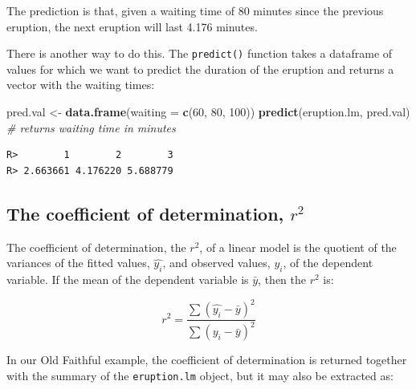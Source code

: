 \documentclass[english,10pt,a4paper,oneside]{book}
\newenvironment{Shaded}{\begin{snugshade}}{\end{snugshade}}
\newcommand{\CommentTok}[1]{\textcolor[rgb]{0.56,0.35,0.01}{\textit{#1}}}
\newcommand{\DataTypeTok}[1]{\textcolor[rgb]{0.13,0.29,0.53}{#1}}
\newcommand{\DecValTok}[1]{\textcolor[rgb]{0.00,0.00,0.81}{#1}}
\newcommand{\KeywordTok}[1]{\textcolor[rgb]{0.13,0.29,0.53}{\textbf{#1}}}
\newcommand{\NormalTok}[1]{#1}
\newcommand{\OperatorTok}[1]{\textcolor[rgb]{0.81,0.36,0.00}{\textbf{#1}}}
\newcommand{\StringTok}[1]{\textcolor[rgb]{0.31,0.60,0.02}{#1}}
\theoremstyle{definition}
\theoremstyle{definition}
\theoremstyle{definition}
\theoremstyle{remark}
\begin{document}
The prediction is that, given a waiting time of 80 minutes since the
previous eruption, the next eruption will last 4.176 minutes.

There is another way to do this. The \texttt{predict()} function takes a
dataframe of values for which we want to predict the duration of the
eruption and returns a vector with the waiting times:

\begin{Shaded}
\begin{Highlighting}[]
\NormalTok{pred.val <-}\StringTok{ }\KeywordTok{data.frame}\NormalTok{(}\DataTypeTok{waiting =} \KeywordTok{c}\NormalTok{(}\DecValTok{60}\NormalTok{, }\DecValTok{80}\NormalTok{, }\DecValTok{100}\NormalTok{))}
\KeywordTok{predict}\NormalTok{(eruption.lm, pred.val) }\CommentTok{# returns waiting time in minutes}
\end{Highlighting}
\end{Shaded}

\begin{verbatim}
R>        1        2        3 
R> 2.663661 4.176220 5.688779
\end{verbatim}

\hypertarget{the-coefficient-of-determination-r2}{%
\subsection{\texorpdfstring{The coefficient of determination,
\(r^{2}\)}{The coefficient of determination, r\^{}\{2\}}}\label{the-coefficient-of-determination-r2}}

The coefficient of determination, the \(r^{2}\), of a linear model is
the quotient of the variances of the fitted values, \(\hat{y_{i}}\), and
observed values, \(y_{i}\), of the dependent variable. If the mean of
the dependent variable is \(\bar y\), then the \(r^{2}\) is:

\[r^{2}=\frac{\sum(\hat{y_{i}} - \bar{y})^{2}}{\sum(y_{i} - \bar{y})^{2}}\]

In our Old Faithful example, the coefficient of determination is
returned together with the summary of the \texttt{eruption.lm} object,
but it may also be extracted as:

\begin{Shaded}
\end{Shaded}
\end{document}
